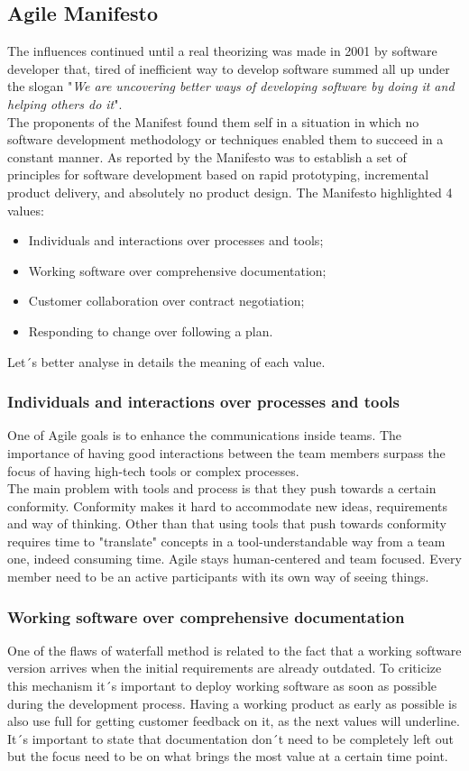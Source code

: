 \documentclass[../main.tex]{subfiles}
\begin{document}
\subsection{Agile Manifesto}
The influences continued until a real theorizing was made in 2001 by software developer that, tired of inefficient way to develop software summed all up under the slogan "\textit{We are uncovering better ways of developing software by doing it and helping others do it}". \\
The proponents of the Manifest found them self in a situation in which no software development methodology or techniques enabled them to succeed in a constant manner. As reported by \citet{schmidt2013software} the Manifesto was to establish a set of principles for software development based on rapid prototyping, incremental product delivery, and absolutely no product design. The Manifesto highlighted 4 values:
\begin{itemize}
    \item Individuals and interactions over processes and tools;
    \item Working software over comprehensive documentation;
    \item Customer collaboration over contract negotiation;
    \item Responding to change over following a plan.
\end{itemize}
Let´s better analyse in details the meaning of each value. 
\subsubsection{Individuals and interactions over processes and tools}
One of Agile goals is to enhance the communications inside teams. The importance of having good interactions between the team members surpass the focus of having high-tech tools or complex processes. \\
The main problem with tools and process is that they push towards a certain conformity. Conformity makes it hard to accommodate new ideas, requirements and way of thinking. Other than that using tools that push towards conformity requires time to "translate" concepts in a tool-understandable way from a team one, indeed consuming time. Agile stays human-centered and team focused. Every member need to be an active participants with its own way of seeing things. 
\subsubsection{Working software over comprehensive documentation}
One of the flaws of waterfall method is related to the fact that a working software version arrives when the initial requirements are already outdated. To criticize this mechanism it´s important to deploy working software as soon as possible during the development process. Having a working product as early as possible is also use full for getting customer feedback on it, as the next values will underline. 
It´s important to state that documentation don´t need to be completely left out but the focus need to be on what brings the most value at a certain time point.
\end{document}
